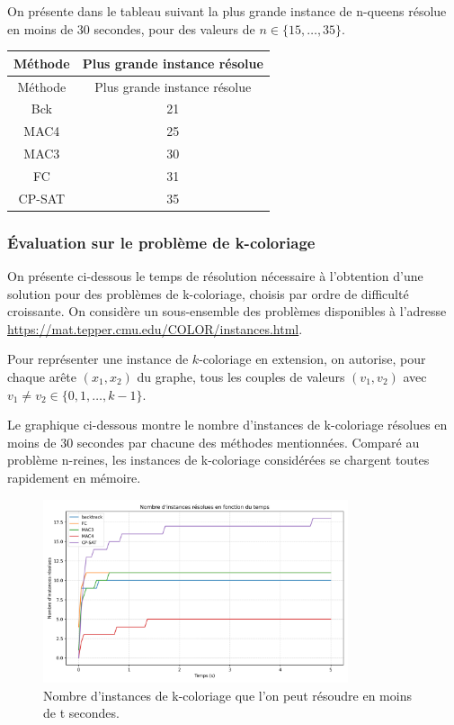 \documentclass[14pt]{article}
\begin{document}
On présente dans le tableau suivant la plus grande instance de n-queens résolue en moins de 30 secondes, pour des valeurs de $n \in \{15,\dots,35\}$.

\begin{longtable}{|c|c|}
	\hline
	Méthode & Plus grande instance résolue \\
	\hline
	\endfirsthead
	
	Méthode & Plus grande instance résolue \\
	\hline
	\endhead
	
	\hline
	\endfoot
	
	\hline
	\endlastfoot
	
	Bck  & 21 \\
	MAC4  & 25 \\
	MAC3  & 30 \\
	FC  & 31 \\
	CP-SAT  & 35 \\
\end{longtable}

\subsubsection{Évaluation sur le problème de k-coloriage}

On présente ci-dessous le temps de résolution nécessaire à l'obtention d'une solution pour des problèmes de k-coloriage, choisis par ordre de difficulté croissante. On considère un sous-ensemble des problèmes disponibles à l'adresse \href{https://mat.tepper.cmu.edu/COLOR/instances.html}{https://mat.tepper.cmu.edu/COLOR/instances.html}.

Pour représenter une instance de $k$-coloriage en extension, on autorise, pour chaque arête $(x_1,x_2)$ du graphe, tous les couples de valeurs $(v_1,v_2)$ avec $v_1 \neq v_2 \in \{0,1,\dots,k-1\}$.

Le graphique ci-dessous montre le nombre d'instances de k-coloriage résolues en moins de 30 secondes par chacune des méthodes mentionnées. Comparé au problème n-reines, les instances de k-coloriage considérées se chargent toutes rapidement en mémoire.

\begin{figure}[H]
	\centering
	\includegraphics[width=0.8\textwidth]{Images/coloring1.png}
	\caption{Nombre d'instances de k-coloriage que l'on peut résoudre en moins de t secondes.}
	\label{fig:coloring1}
\end{figure}
\end{document}
